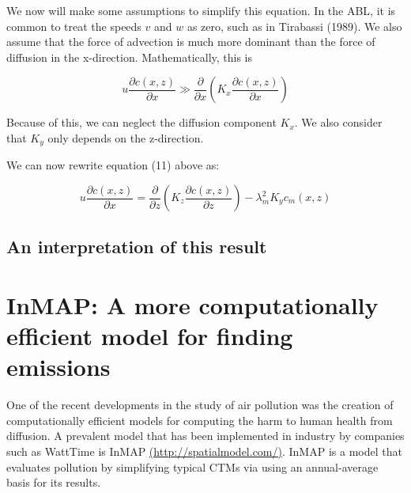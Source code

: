 \documentclass{article}
\begin{document}
We now will make some assumptions to simplify this equation. In the ABL, it is common to treat the speeds $v$ and $w$ as zero, such as in Tirabassi (1989).
We also assume that the force of advection is much more dominant than the force of diffusion in the x-direction. Mathematically, this is

$$
    u \frac{\partial c(x, z)}{\partial x} \gg \frac{\partial}{\partial x} (K_x\frac{\partial c(x, z)}{\partial x})
$$

Because of this, we can neglect the diffusion component $K_x$. We also consider that $K_y$ only depends on the z-direction.

We can now rewrite equation (11) above as:

\begin{equation}
    u \frac{\partial c(x, z)}{\partial x} = \frac{\partial} {\partial z} (K_z \frac{\partial c(x, z)}{\partial z}) - \lambda_m^2 K_y c_m(x, z)
\end{equation}

\subsection{An interpretation of this result}

\section{InMAP: A more computationally efficient model for finding emissions}

One of the recent developments in the study of air pollution was the creation of computationally efficient models for computing the harm to human health from
diffusion. A prevalent model that has been implemented in industry by companies such as WattTime is InMAP \url{(http://spatialmodel.com/)}. 
InMAP is a model that evaluates pollution by simplifying typical CTMs via using an annual-average basis for its results. 
\end{document}
